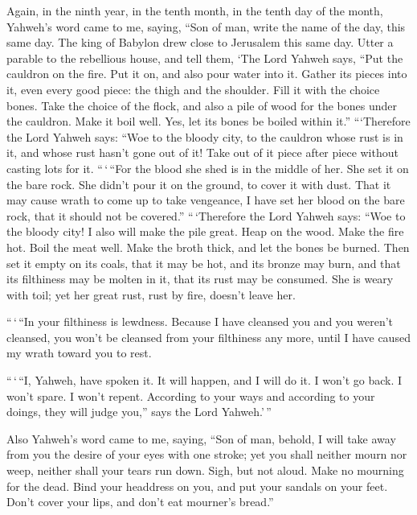  Again, in the ninth year, in the tenth month, in the tenth
day of the month, Yahweh's word came to me, saying,  ``Son
of man, write the name of the day, this same day. The king of Babylon
drew close to Jerusalem this same day.  Utter a parable to
the rebellious house, and tell them, `The Lord Yahweh says, ``Put the
cauldron on the fire. Put it on, and also pour water into it.
 Gather its pieces into it, even every good piece: the thigh
and the shoulder. Fill it with the choice bones.  Take the
choice of the flock, and also a pile of wood for the bones under the
cauldron. Make it boil well. Yes, let its bones be boiled within it.''
 ```Therefore the Lord Yahweh says: ``Woe to the bloody
city, to the cauldron whose rust is in it, and whose rust hasn't gone
out of it! Take out of it piece after piece without casting lots for it.
 ``\,`\,``For the blood she shed is in the middle of her.
She set it on the bare rock. She didn't pour it on the ground, to cover
it with dust.  That it may cause wrath to come up to take
vengeance, I have set her blood on the bare rock, that it should not be
covered.''  ``\,`Therefore the Lord Yahweh says: ``Woe to
the bloody city! I also will make the pile great.  Heap on
the wood. Make the fire hot. Boil the meat well. Make the broth thick,
and let the bones be burned.  Then set it empty on its
coals, that it may be hot, and its bronze may burn, and that its
filthiness may be molten in it, that its rust may be consumed.
 She is weary with toil; yet her great rust, rust by fire,
doesn't leave her.

 ``\,`\,``In your filthiness is lewdness. Because I have
cleansed you and you weren't cleansed, you won't be cleansed from your
filthiness any more, until I have caused my wrath toward you to rest.

 ``\,`\,``I, Yahweh, have spoken it. It will happen, and I
will do it. I won't go back. I won't spare. I won't repent. According to
your ways and according to your doings, they will judge you,'' says the
Lord Yahweh.'\,''

 Also Yahweh's word came to me, saying,  ``Son
of man, behold, I will take away from you the desire of your eyes with
one stroke; yet you shall neither mourn nor weep, neither shall your
tears run down.  Sigh, but not aloud. Make no mourning for
the dead. Bind your headdress on you, and put your sandals on your feet.
Don't cover your lips, and don't eat mourner's bread.''

